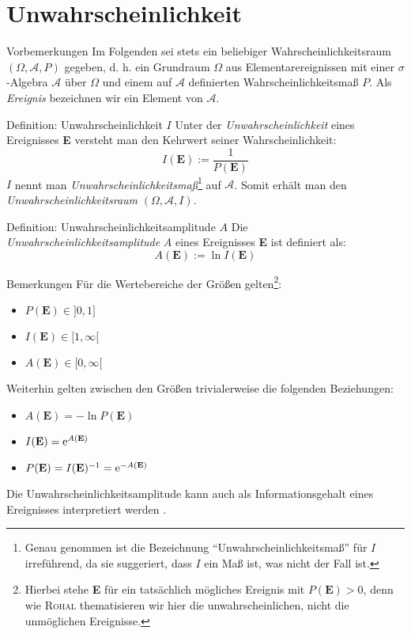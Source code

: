 \section{Unwahrscheinlichkeit}
\begin{bla}{Vorbemerkungen}
Im Folgenden sei stets ein beliebiger Wahrscheinlichkeitsraum $(\Omega,\mathcal{A},P)$ gegeben, d. h. ein Grundraum $\Omega$ aus Elementarereignissen mit einer $\sigma$-Algebra $\mathcal{A}$ über $\Omega$ und einem auf $\mathcal{A}$ definierten Wahrscheinlichkeitsmaß $P$. Als \emph{Ereignis} bezeichnen wir ein Element von $\mathcal{A}$.
\end{bla}
\begin{bla}{Definition: Unwahrscheinlichkeit $I$}
Unter der \emph{Unwahrscheinlichkeit} eines Ereignisses \textbf{E} versteht man den Kehrwert seiner Wahrscheinlichkeit:\\
\begin{equation}
I(\textbf{E}) := \frac{1}{P(\textbf{E})}
\end{equation}
$I$ nennt man \emph{Unwahrscheinlichkeitsmaß}\footnote{Genau genommen ist die Bezeichnung "`Unwahrscheinlichkeitsmaß"' für $I$ irreführend, da sie suggeriert, dass $I$ ein Maß ist, was nicht der Fall ist.} auf $\mathcal{A}$. Somit erhält man den \emph{Unwahrscheinlichkeitsraum} $(\Omega,\mathcal{A},I)$.
\end{bla}
\clearpage
\begin{bla}{Definition: Unwahrscheinlichkeitsamplitude $A$}
Die \emph{Unwahrscheinlichkeitsamplitude} $A$ eines Ereignisses \textbf{E} ist definiert als:
\begin{equation}
A(\textbf{E}) := \ln{I(\textbf{E})}
\end{equation}
\end{bla}
\begin{bla}{Bemerkungen}
Für die Wertebereiche der Größen gelten\footnote{Hierbei stehe \textbf{E} für ein tatsächlich mögliches Ereignis mit $P(\textbf{E}) > 0$, denn wie \textsc{Rohal} thematisieren wir hier die unwahrscheinlichen, nicht die unmöglichen Ereignisse.}:
\begin{itemize}
\item $P(\textbf{E}) \in ]0,1]$
\item $I(\textbf{E}) \in [1,\infty[$
\item $A(\textbf{E}) \in [0,\infty[$
\end{itemize}
Weiterhin gelten zwischen den Größen trivialerweise die folgenden Beziehungen:
\begin{itemize}
\item $A(\textbf{E}) = - \ln P(\textbf{E})$
\item $I(\textbf{E}) = \text{\rmfamily e} ^ {A(\textbf{E})}$
\item $P(\textbf{E}) = I(\textbf{E}) ^{-1} = \text{\rmfamily e} ^{-A(\textbf{E})}$
\end{itemize}
Die Unwahrscheinlichkeitsamplitude kann auch als Informationsgehalt eines Ereignisses interpretiert werden \cite{informationstheorie}.
\end{bla}
